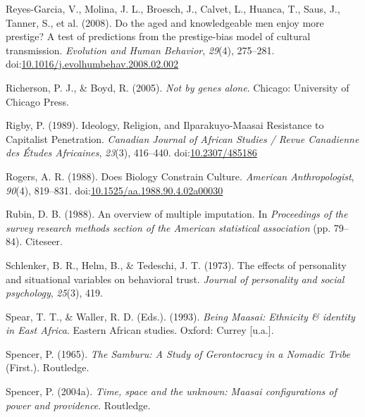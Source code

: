 \documentclass[
  11pt,
]{article}
\begin{document}
\leavevmode\hypertarget{ref-reyes-garciaAgedKnowledgeableMen2008}{}%
Reyes-Garcia, V., Molina, J. L., Broesch, J., Calvet, L., Huanca, T.,
Saus, J., Tanner, S., et al. (2008). Do the aged and knowledgeable men
enjoy more prestige? A test of predictions from the prestige-bias model
of cultural transmission. \emph{Evolution and Human Behavior},
\emph{29}(4), 275--281.
doi:\href{https://doi.org/10.1016/j.evolhumbehav.2008.02.002}{10.1016/j.evolhumbehav.2008.02.002}

\leavevmode\hypertarget{ref-richersonNotGenesAlone2005}{}%
Richerson, P. J., \& Boyd, R. (2005). \emph{Not by genes alone}.
Chicago: University of Chicago Press.

\leavevmode\hypertarget{ref-rigbyIdeologyReligionIlparakuyoMaasai1989a}{}%
Rigby, P. (1989). Ideology, Religion, and Ilparakuyo-Maasai Resistance
to Capitalist Penetration. \emph{Canadian Journal of African Studies /
Revue Canadienne des Études Africaines}, \emph{23}(3), 416--440.
doi:\href{https://doi.org/10.2307/485186}{10.2307/485186}

\leavevmode\hypertarget{ref-rogersDoesBiologyConstrain1988}{}%
Rogers, A. R. (1988). Does Biology Constrain Culture. \emph{American
Anthropologist}, \emph{90}(4), 819--831.
doi:\href{https://doi.org/10.1525/aa.1988.90.4.02a00030}{10.1525/aa.1988.90.4.02a00030}

\leavevmode\hypertarget{ref-rubin1988overview}{}%
Rubin, D. B. (1988). An overview of multiple imputation. In
\emph{Proceedings of the survey research methods section of the American
statistical association} (pp. 79--84). Citeseer.

\leavevmode\hypertarget{ref-schlenker1973effects}{}%
Schlenker, B. R., Helm, B., \& Tedeschi, J. T. (1973). The effects of
personality and situational variables on behavioral trust. \emph{Journal
of personality and social psychology}, \emph{25}(3), 419.

\leavevmode\hypertarget{ref-spearBeingMaasaiEthnicity1993}{}%
Spear, T. T., \& Waller, R. D. (Eds.). (1993). \emph{Being Maasai:
Ethnicity \& identity in East Africa}. Eastern African studies. Oxford:
Currey {[}u.a.{]}.

\leavevmode\hypertarget{ref-spencerSamburuStudyGerontocracy1965}{}%
Spencer, P. (1965). \emph{The Samburu: A Study of Gerontocracy in a
Nomadic Tribe} (First.). Routledge.

\leavevmode\hypertarget{ref-spencerTimeSpaceUnknown2004}{}%
Spencer, P. (2004a). \emph{Time, space and the unknown: Maasai
configurations of power and providence}. Routledge.
\end{document}
